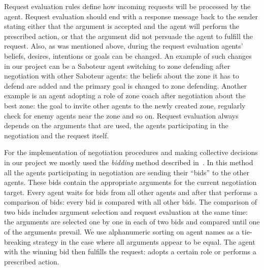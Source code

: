 Request evaluation rules define how incoming requests will be processed by the agent.
Request evaluation should end with a response message back to the sender stating either that the argument is accepted and the agent will perform the prescribed action, or that the argument did not persuade the agent to fulfill the request.
Also, as was mentioned above, during the request evaluation agents' beliefs, desires, intentions or goals can be changed.
An example of such changes in our project can be a Saboteur agent switching to zone defending after negotiation with other Saboteur agents: the beliefs about the zone it has to defend are added and the primary goal is changed to zone defending.
Another example is an agent adopting a role of zone coach after negotiation about the best zone: the goal to invite other agents to the newly created zone, regularly check for enemy agents near the zone and so on.
Request evaluation always depends on the arguments that are used, the agents participating in the negotiation and the request itself.

For the implementation of negotiation procedures and making collective decisions in our project we mostly used the \emph{bidding} method described in~\cite{bordini_programming_2007}.
In this method all the agents participating in negotiation are sending their \enquote{bids} to the other agents.
These bids contain the appropriate arguments for the current negotiation target.
Every agent waits for bids from all other agents and after that performs a comparison of bids: every bid is compared with all other bids.
The comparison of two bids includes argument selection and request evaluation at the same time: the arguments are selected one by one in each of two bids and compared until one of the arguments prevail.
We use alphanumeric sorting on agent names as a tie-breaking strategy in the case where all arguments appear to be equal.
The agent with the winning bid then fulfills the request: adopts a certain role or performs a prescribed action.
